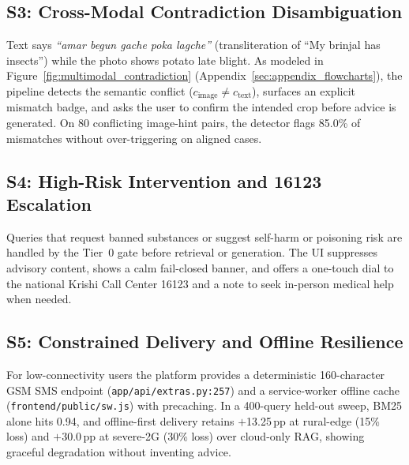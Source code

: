 \subsection{S3: Cross-Modal Contradiction Disambiguation}
Text says \textit{``amar begun gache poka lagche''} (transliteration of ``My brinjal has insects'') while the photo shows potato late blight. As modeled in Figure~\ref{fig:multimodal_contradiction} (Appendix~\ref{sec:appendix_flowcharts}), the pipeline detects the semantic conflict ($c_{\text{image}} \neq c_{\text{text}}$), surfaces an explicit mismatch badge, and asks the user to confirm the intended crop before advice is generated. On 80 conflicting image-hint pairs, the detector flags 85.0\% of mismatches without over-triggering on aligned cases.

\subsection{S4: High-Risk Intervention and 16123 Escalation}
Queries that request banned substances or suggest self-harm or poisoning risk are handled by the Tier~0 gate before retrieval or generation. The UI suppresses advisory content, shows a calm fail-closed banner, and offers a one-touch dial to the national Krishi Call Center 16123 and a note to seek in-person medical help when needed.

\subsection{S5: Constrained Delivery and Offline Resilience}
For low-connectivity users the platform provides a deterministic 160-character GSM SMS endpoint (\texttt{app/api/extras.py:257}) and a service-worker offline cache (\texttt{frontend/public/sw.js}) with precaching. In a 400-query held-out sweep, BM25 alone hits 0.94, and offline-first delivery retains $+$13.25\,pp at rural-edge (15\% loss) and $+$30.0\,pp at severe-2G (30\% loss) over cloud-only RAG, showing graceful degradation without inventing advice.

